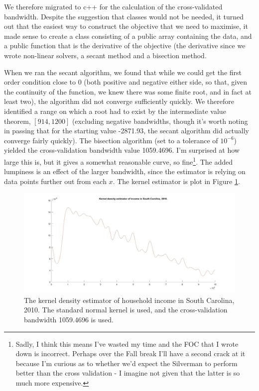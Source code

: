 \documentclass{article}
\begin{document}
We therefore migrated to c++ for the calculation of the cross-validated bandwidth. Despite the suggestion that classes would not be needed, it turned out that the easiest way to construct the objective that we need to maximise, it made sense to create a class consisting of a public array containing the data, and a public function that is the derivative of the objective (the derivative since we wrote non-linear solvers, a secant method and a bisection method. 

When we ran the secant algorithm, we found that while we could get the first order condition close to 0 (both positive and negative either side, so that, given the continuity of the function, we knew there was some finite root, and in fact at least two), the algorithm did not converge sufficiently quickly. We therefore identified a range on which a root had to exist by the intermediate value theorem, $[914,1200]$ (excluding negative bandwidths, though it's worth noting in passing that for the starting value -2871.93, the secant algorithm did actually converge fairly quickly). The bisection algorithm (set to a tolerance of $10^{-6}$) yielded the cross-validation bandwidth value 1059.4696. I'm surprised at how large this is, but it gives a somewhat reasonable curve, so fine\footnote{Sadly, I think this means I've wasted my time and the FOC that I wrote down is incorrect. Perhaps over the Fall break I'll have a second crack at it because I'm curious as to whether we'd expect the Silverman to perform better than the cross validation - I imagine not given that the latter is so much more expensive.}. The added lumpiness is an effect of the larger bandwidth, since the estimator is relying on data points further out from each $x$.  The kernel estimator is plot in Figure \ref{fig:q4c}.

\begin{center}
\begin{figure}
\centering
\includegraphics[width=13cm]{q4c.jpg}
\caption{The kernel density estimator of household income in South Carolina, 2010. The standard normal kernel is used, and the cross-validation bandwidth 1059.4696 is used.}
\label{fig:q4c}
\end{figure} 
\end{center}
\end{document}
